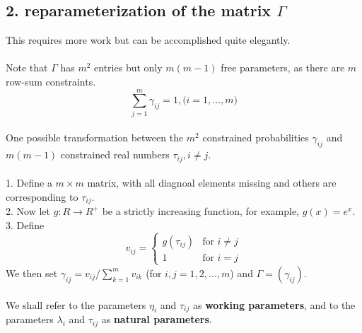 \documentclass{article}
\begin{document}
\subsection*{2. reparameterization of the matrix $\Gamma$}
This requires more work but can be accomplished quite elegantly. \\
\\
Note that $\Gamma$ has $m^2$ entries but only $m(m-1)$ free parameters, as there are $m$ row-sum constraints. 
$$\sum_{j=1}^m \gamma_{ij} = 1, \text{($i = 1, ..., m$)}$$
\\
One possible transformation between the $m^2$ constrained probabilities $\gamma_{ij}$ and $m(m-1)$ constrained real numbers $\tau_{ij}, i \neq j$. \\
\\
1. Define a $m \times m$ matrix, with all diagnoal elements missing and others are corresponding to $\tau_{ij}$. \\
2. Now let $g: R \rightarrow R^+$ be a strictly increasing function, for example, $g(x) = e^x$. \\
3. Define \\
\[ v_{ij} = \begin{cases}
    g(\tau_{ij}) & \text{for $i \neq j$} \\
    1 & \text{for $i = j$}
\end{cases} \]
We then set $\gamma_{ij} = v_{ij} / \sum_{k=1}^m v_{ik}$ (for $i, j = 1, 2, ..., m$) and $\Gamma = (\gamma_{ij})$. \\
\\
We shall refer to the parameters $\eta_i$ and $\tau_{ij}$ as \textbf{working parameters}, and to the parameters $\lambda_i$ and $\tau_{ij}$ as \textbf{natural parameters}. 
\end{document}
